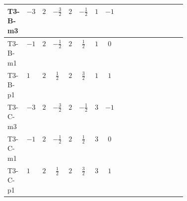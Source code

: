 \documentclass[8pt]{article}
\begin{document}
\begin{landscape}
\begin{longtable}{@{}llcccccc >{\raggedright\arraybackslash}p{0.21\linewidth} >{\raggedright\arraybackslash}p{0.21\linewidth}@{}}
\midrule
T3-B-m3 & $-3$ & $2$ & $-\frac{3}{2}$ & $2$ & $-\frac{1}{2}$ & $1$ & $-1$ & \scriptsize\adjustbox{max width=\linewidth}{$\begin{gathered} 6 C_{5} Y_d Y_d^\dagger\end{gathered}$} & \scriptsize\adjustbox{max width=\linewidth}{$\begin{gathered} 6 C_{5} Y_u Y_u^\dagger\end{gathered}$} \\
\midrule
T3-B-m1 & $-1$ & $2$ & $-\frac{1}{2}$ & $2$ & $\frac{1}{2}$ & $1$ & $0$ & \scriptsize\adjustbox{max width=\linewidth}{$\begin{gathered} 6 C_{5} Y_d Y_d^\dagger\end{gathered}$} & \scriptsize\adjustbox{max width=\linewidth}{$\begin{gathered} 6 C_{5} Y_u Y_u^\dagger\end{gathered}$} \\
\midrule
T3-B-p1 & $1$ & $2$ & $\frac{1}{2}$ & $2$ & $\frac{3}{2}$ & $1$ & $1$ & \scriptsize\adjustbox{max width=\linewidth}{$\begin{gathered} 6 C_{5} Y_d Y_d^\dagger\end{gathered}$} & \scriptsize\adjustbox{max width=\linewidth}{$\begin{gathered} 6 C_{5} Y_u Y_u^\dagger\end{gathered}$} \\
\midrule
T3-C-m3 & $-3$ & $2$ & $-\frac{3}{2}$ & $2$ & $-\frac{1}{2}$ & $3$ & $-1$ & \scriptsize\adjustbox{max width=\linewidth}{$\begin{gathered} 6 C_{5} Y_d Y_d^\dagger\end{gathered}$} & \scriptsize\adjustbox{max width=\linewidth}{$\begin{gathered} 6 C_{5} Y_u Y_u^\dagger\end{gathered}$} \\
\midrule
T3-C-m1 & $-1$ & $2$ & $-\frac{1}{2}$ & $2$ & $\frac{1}{2}$ & $3$ & $0$ & \scriptsize\adjustbox{max width=\linewidth}{$\begin{gathered} 6 C_{5} Y_d Y_d^\dagger\end{gathered}$} & \scriptsize\adjustbox{max width=\linewidth}{$\begin{gathered} 6 C_{5} Y_u Y_u^\dagger\end{gathered}$} \\
\midrule
T3-C-p1 & $1$ & $2$ & $\frac{1}{2}$ & $2$ & $\frac{3}{2}$ & $3$ & $1$ & \scriptsize\adjustbox{max width=\linewidth}{$\begin{gathered} 6 C_{5} Y_d Y_d^\dagger\end{gathered}$} & \scriptsize\adjustbox{max width=\linewidth}{$\begin{gathered} 6 C_{5} Y_u Y_u^\dagger\end{gathered}$} \\

\end{longtable}
\end{landscape}
\end{document}
